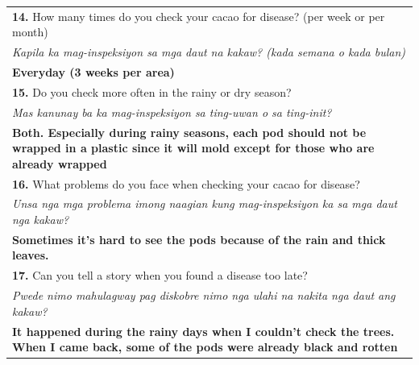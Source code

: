 \begin{longtable}{|p{4cm}|p{10cm}|}
		\multicolumn{2}{|p{12cm}|}{\vspace{0.1cm} \textbf{14.} How many times do you check your cacao for disease? (per week or per month)}                                                    \\
		\multicolumn{2}{|p{12cm}|}{\textit{Kapila ka mag-inspeksiyon sa mga daut na kakaw? (kada semana o kada bulan)}}                                                                        \\
		\multicolumn{2}{|p{12cm}|}{\textbf{Everyday (3 weeks per area)}}                                                                                                                       \\

		\multicolumn{2}{|p{12cm}|}{\vspace{0.1cm} \textbf{15.} Do you check more often in the rainy or dry season?}                                                                            \\
		\multicolumn{2}{|p{12cm}|}{\textit{Mas kanunay ba ka mag-inspeksiyon sa ting-uwan o sa ting-init?}}                                                                                    \\
		\multicolumn{2}{|p{12cm}|}{\textbf{Both. Especially during rainy seasons, each pod should not be wrapped in a plastic since it will mold except for those who are already wrapped}}    \\

		\multicolumn{2}{|p{12cm}|}{\vspace{0.1cm} \textbf{16.} What problems do you face when checking your cacao for disease?}                                                                \\
		\multicolumn{2}{|p{12cm}|}{\textit{Unsa nga mga problema imong naagian kung mag-inspeksiyon ka sa mga daut nga kakaw?}}                                                                \\
		\multicolumn{2}{|p{12cm}|}{\textbf{Sometimes it’s hard to see the pods because of the rain and thick leaves.}}                                                                         \\

		\multicolumn{2}{|p{12cm}|}{\vspace{0.1cm} \textbf{17.} Can you tell a story when you found a disease too late?}                                                                        \\
		\multicolumn{2}{|p{12cm}|}{\textit{Pwede nimo mahulagway pag diskobre nimo nga ulahi na nakita nga daut ang kakaw?}}                                                                   \\
		\multicolumn{2}{|p{12cm}|}{\textbf{It happened during the rainy days when I couldn’t check the trees. When I came back, some of the pods were already black and rotten}}               \\


\end{longtable}
